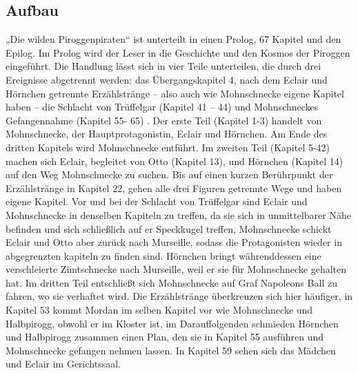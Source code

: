 \subsection{Aufbau}
„Die wilden Piroggenpiraten“ ist unterteilt in einen Prolog, 67 Kapitel und den Epilog. Im Prolog wird der Leser in die Geschichte und den Kosmos der Piroggen eingeführt. Die Handlung lässt sich in vier Teile unterteilen, die durch drei Ereignisse abgetrennt werden: das Übergangskapitel 4, nach dem Eclair und Hörnchen getrennte Erzählstränge – also auch wie Mohnschnecke eigene Kapitel haben – die Schlacht von Trüffelgar (Kapitel 41 – 44) und Mohnschneckes Gefangennahme (Kapitel 55- 65) . Der erste Teil (Kapitel 1-3) handelt von Mohnschnecke, der Hauptprotagonistin, Eclair und Hörnchen. Am Ende des dritten Kapitels wird Mohnschnecke entführt. Im zweiten Teil (Kapitel 5-42) machen sich Eclair, begleitet von Otto (Kapitel 13), und Hörnchen (Kapitel 14) auf den Weg Mohnschnecke zu suchen. Bis auf einen kurzen Berührpunkt der Erzählstränge in Kapitel 22, gehen alle drei Figuren getrennte Wege und haben eigene Kapitel. Vor und bei der Schlacht von Trüffelgar sind Eclair und Mohnschnecke in denselben Kapiteln zu treffen, da sie sich in unmittelbarer Nähe befinden und sich schließlich auf er Speckkugel treffen,  Mohnschnecke schickt Eclair und Otto aber zurück nach Murseille, sodass die Protagonisten wieder in abgegrenzten kapiteln zu finden sind. Hörnchen bringt währenddessen eine verschleierte Zimtschnecke nach Murseille, weil er sie für Mohnschnecke gehalten hat. Im dritten Teil entschließt sich Mohnschnecke auf Graf Napoleons Ball zu fahren, wo sie verhaftet wird. Die Erzählstränge überkreuzen sich hier häufiger, in Kapitel 53 kommt Mordan im selben Kapitel vor wie Mohnschnecke und Halbpirogg, obwohl er im Kloster ist, im Darauffolgenden schmieden Hörnchen und Halbpirogg zusammen einen Plan, den sie in Kapitel 55 ausführen und Mohnschnecke gefangen nehmen lassen. In Kapitel 59 sehen sich das Mädchen und Eclair im Gerichtssaal. 

